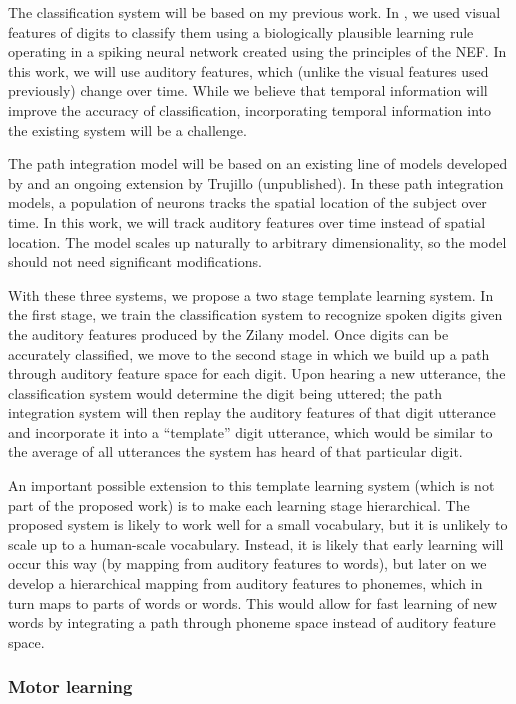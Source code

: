 \documentclass{article}
\begin{document}
The classification system will be based
on my previous work.
In \citet{bekolay2013}, we used visual features
of digits to classify them
using a biologically plausible learning rule
operating in a spiking neural network
created using the principles of the NEF.
In this work, we will use auditory features,
which (unlike the visual features used previously)
change over time.
While we believe that temporal information
will improve the accuracy of classification,
incorporating temporal information
into the existing system will be a challenge.

The path integration model will be based
on an existing line of models
developed by \citet{conklin2005}
and an ongoing extension
by Trujillo (unpublished).
In these path integration models,
a population of neurons tracks
the spatial location of the subject
over time.
In this work, we will track
auditory features over time
instead of spatial location.
The \citeauthor{conklin2005}
model scales up naturally
to arbitrary dimensionality,
so the model should not need
significant modifications.

With these three systems,
we propose a
two stage template learning system.
In the first stage,
we train the classification system
to recognize spoken digits
given the auditory features
produced by the Zilany model.
Once digits can be accurately classified,
we move to the second stage
in which we build up a path through
auditory feature space for each digit.
Upon hearing a new utterance,
the classification system
would determine the digit being uttered;
the path integration system
will then replay the auditory features
of that digit utterance
and incorporate it into
a ``template'' digit utterance,
which would be similar to the
average of all utterances
the system has heard
of that particular digit.

An important possible extension to
this template learning system
(which is not part of the proposed work)
is to make each learning stage hierarchical.
The proposed system is likely
to work well for a small vocabulary,
but it is unlikely to scale up to
a human-scale vocabulary.
Instead, it is likely that
early learning will occur this way
(by mapping from auditory features to words),
but later on we develop a hierarchical mapping
from auditory features to phonemes,
which in turn maps to parts of words or words.
This would allow for fast learning
of new words by integrating
a path through phoneme space
instead of auditory feature space.

\subsubsection{Motor learning}
\label{subsec:motor-learning}
\end{document}
